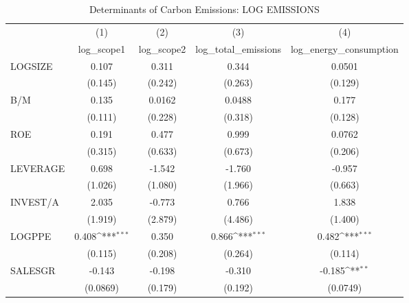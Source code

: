 \begin{table}[htbp]\centering
\def\sym#1{\ifmmode^{#1}\else\(^{#1}\)\fi}
\caption{Determinants of Carbon Emissions: LOG EMISSIONS}
\begin{tabular}{l*{4}{c}}
\hline\hline
                    &\multicolumn{1}{c}{(1)}&\multicolumn{1}{c}{(2)}&\multicolumn{1}{c}{(3)}&\multicolumn{1}{c}{(4)}\\
                    &\multicolumn{1}{c}{log\_scope1}&\multicolumn{1}{c}{log\_scope2}&\multicolumn{1}{c}{log\_total\_emissions}&\multicolumn{1}{c}{log\_energy\_consumption}\\
\hline
LOGSIZE             &       0.107         &       0.311         &       0.344         &      0.0501         \\
                    &     (0.145)         &     (0.242)         &     (0.263)         &     (0.129)         \\
B/M                 &       0.135         &      0.0162         &      0.0488         &       0.177         \\
                    &     (0.111)         &     (0.228)         &     (0.318)         &     (0.128)         \\
ROE                 &       0.191         &       0.477         &       0.999         &      0.0762         \\
                    &     (0.315)         &     (0.633)         &     (0.673)         &     (0.206)         \\
LEVERAGE            &       0.698         &      -1.542         &      -1.760         &      -0.957         \\
                    &     (1.026)         &     (1.080)         &     (1.966)         &     (0.663)         \\
INVEST/A            &       2.035         &      -0.773         &       0.766         &       1.838         \\
                    &     (1.919)         &     (2.879)         &     (4.486)         &     (1.400)         \\
LOGPPE              &       0.408\sym{***}&       0.350         &       0.866\sym{***}&       0.482\sym{***}\\
                    &     (0.115)         &     (0.208)         &     (0.264)         &     (0.114)         \\
SALESGR             &      -0.143         &      -0.198         &      -0.310         &      -0.185\sym{**} \\
                    &    (0.0869)         &     (0.179)         &     (0.192)         &    (0.0749)         \\

\end{tabular}
\end{table}
